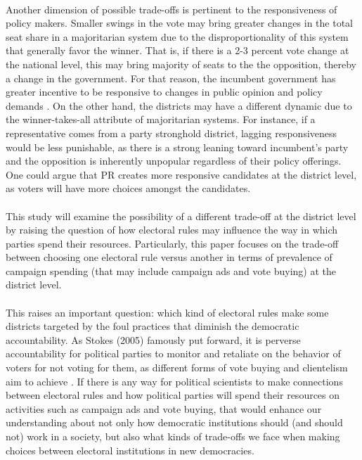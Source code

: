 \documentclass{article}
\begin{document}
\\
Another dimension of possible trade-offs is pertinent to the responsiveness of policy makers. Smaller swings in the vote may bring greater changes in the total seat share in a majoritarian system due to the disproportionality of this system that generally favor the winner. That is, if there is a 2-3 percent vote change at the national level, this may bring majority of seats to the the opposition, thereby a change in the government. For that reason, the incumbent government has greater incentive to be responsive to changes in public opinion and policy demands \cite{norris1997choosing}. On the other hand, the districts may have a different dynamic due to the winner-takes-all attribute of majoritarian systems. For instance, if a representative comes from a party stronghold district, lagging responsiveness would be less punishable, as there is a strong leaning toward incumbent's party and the opposition is inherently unpopular regardless of their policy offerings. One could argue that PR creates more responsive candidates at the district level, as voters will have more choices amongst the candidates.\\
\\
This study will examine the possibility of a different trade-off at the district level by raising the question of how electoral rules may influence the way in which parties spend their resources. Particularly, this paper focuses on the trade-off between choosing one electoral rule versus another in terms of prevalence of campaign spending (that may include campaign ads and vote buying) at the district level.\\
\\
This raises an important question: which kind of electoral rules make some districts targeted by the foul practices that diminish the democratic accountability. As Stokes (2005) famously put forward, it is perverse accountability for political parties to monitor and retaliate on the behavior of voters for not voting for them, as different forms of vote buying and clientelism aim to achieve \cite{stokes_perverse_2005}. If there is any way for political scientists to make connections between electoral rules and how political parties will spend their resources on activities such as campaign ads and vote buying, that would enhance our understanding about not only how democratic institutions should (and should not) work in a society, but also what kinds of trade-offs we face when making choices between electoral institutions in new democracies.\\
\end{document}
